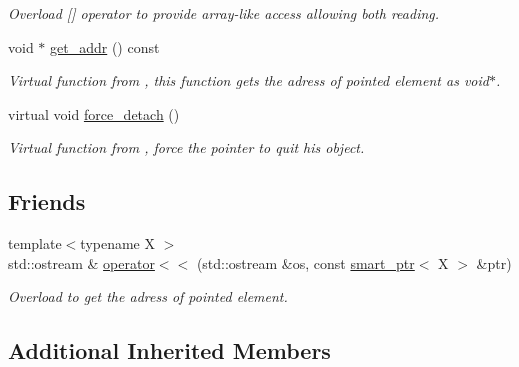\begin{DoxyCompactItemize}
\begin{DoxyCompactList}\small\item\em Overload \mbox{[}\mbox{]} operator to provide array-\/like access allowing both reading. \end{DoxyCompactList}\item 
\hypertarget{classsmart__ptr_ae0aefbc3f4ce30265a11989cf1aaa3c9}{void $\ast$ \hyperlink{classsmart__ptr_ae0aefbc3f4ce30265a11989cf1aaa3c9}{get\-\_\-addr} () const }\label{classsmart__ptr_ae0aefbc3f4ce30265a11989cf1aaa3c9}

\begin{DoxyCompactList}\small\item\em Virtual function from , this function gets the adress of pointed element as void$\ast$. \end{DoxyCompactList}\item 
\hypertarget{classsmart__ptr_a7497c5dc4803cc5b3f1ca532336c799e}{virtual void \hyperlink{classsmart__ptr_a7497c5dc4803cc5b3f1ca532336c799e}{force\-\_\-detach} ()}\label{classsmart__ptr_a7497c5dc4803cc5b3f1ca532336c799e}

\begin{DoxyCompactList}\small\item\em Virtual function from , force the pointer to quit his object. \end{DoxyCompactList}\end{DoxyCompactItemize}
\subsection*{Friends}
\begin{DoxyCompactItemize}
\item 
\hypertarget{classsmart__ptr_afbd57dbffd4a8a0b2df4a703fb4826d3}{{\footnotesize template$<$typename X $>$ }\\std\-::ostream \& \hyperlink{classsmart__ptr_afbd57dbffd4a8a0b2df4a703fb4826d3}{operator$<$$<$} (std\-::ostream \&os, const \hyperlink{classsmart__ptr}{smart\-\_\-ptr}$<$ X $>$ \&ptr)}\label{classsmart__ptr_afbd57dbffd4a8a0b2df4a703fb4826d3}

\begin{DoxyCompactList}\small\item\em Overload to get the adress of pointed element. \end{DoxyCompactList}\end{DoxyCompactItemize}
\subsection*{Additional Inherited Members}



